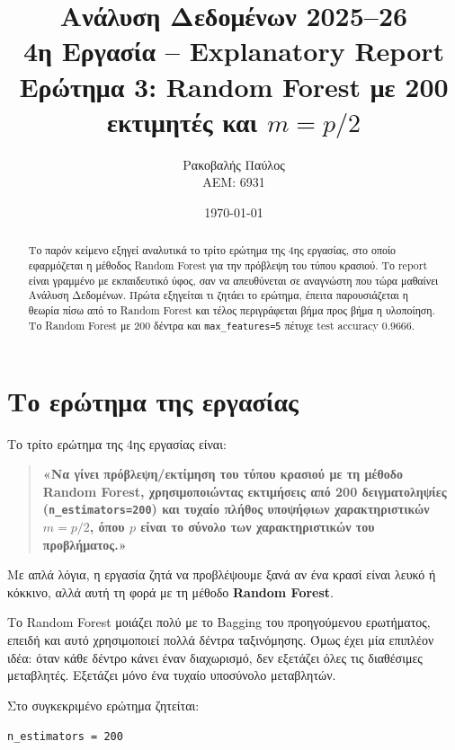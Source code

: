 \documentclass[12pt,a4paper]{article}
\title{
    \textbf{Ανάλυση Δεδομένων 2025--26}\\[0.25cm]
    \Large 4η Εργασία -- Explanatory Report\\[0.15cm]
    \large Ερώτημα 3: Random Forest με 200 εκτιμητές και $m=p/2$
}
\author{
    Ρακοβαλής Παύλος\\
    ΑΕΜ: 6931
}
\date{\today}
\newcommand{\code}[1]{\texttt{\textenglish{#1}}}
\begin{document}
\maketitle
\thispagestyle{fancy}

\begin{abstract}
Το παρόν κείμενο εξηγεί αναλυτικά το τρίτο ερώτημα της 4ης εργασίας, στο
οποίο εφαρμόζεται η μέθοδος Random Forest για την πρόβλεψη του τύπου κρασιού.
Το report είναι γραμμένο με εκπαιδευτικό ύφος, σαν να απευθύνεται σε αναγνώστη
που τώρα μαθαίνει Ανάλυση Δεδομένων. Πρώτα εξηγείται τι ζητάει το ερώτημα,
έπειτα παρουσιάζεται η θεωρία πίσω από το Random Forest και τέλος περιγράφεται
βήμα προς βήμα η υλοποίηση. Το Random Forest με 200 δέντρα και
\code{max\_features=5} πέτυχε test accuracy 0.9666.
\end{abstract}

\tableofcontents
\newpage

\section{Το ερώτημα της εργασίας}

Το τρίτο ερώτημα της 4ης εργασίας είναι:

\begin{quote}
\textbf{«Να γίνει πρόβλεψη/εκτίμηση του τύπου κρασιού με τη μέθοδο Random
Forest, χρησιμοποιώντας εκτιμήσεις από 200 δειγματοληψίες
(\code{n\_estimators=200}) και τυχαίο πλήθος υποψήφιων χαρακτηριστικών
$m=p/2$, όπου $p$ είναι το σύνολο των χαρακτηριστικών του προβλήματος.»}
\end{quote}

Με απλά λόγια, η εργασία ζητά να προβλέψουμε ξανά αν ένα κρασί είναι λευκό ή
κόκκινο, αλλά αυτή τη φορά με τη μέθοδο \textbf{Random Forest}.

Το Random Forest μοιάζει πολύ με το Bagging του προηγούμενου ερωτήματος, επειδή
και αυτό χρησιμοποιεί πολλά δέντρα ταξινόμησης. Όμως έχει μία επιπλέον ιδέα:
όταν κάθε δέντρο κάνει έναν διαχωρισμό, δεν εξετάζει όλες τις διαθέσιμες
μεταβλητές. Εξετάζει μόνο ένα τυχαίο υποσύνολο μεταβλητών.

Στο συγκεκριμένο ερώτημα ζητείται:

\begin{center}
\code{n\_estimators = 200}
\end{center}
\end{document}
